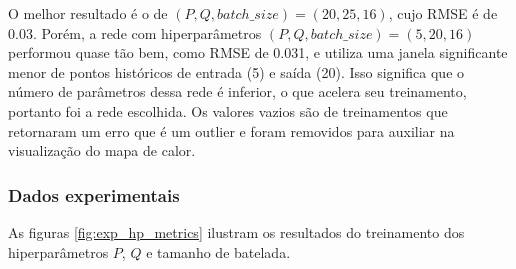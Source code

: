 O melhor resultado é o de $(P,Q,batch\_size)=(20,25,16)$, cujo RMSE é de 0.03.  Porém, a rede com hiperparâmetros $(P,Q,batch\_size)=(5,20,16)$ performou quase tão bem, como RMSE de 0.031, e utiliza uma janela significante menor de pontos históricos de entrada (5) e saída (20). Isso significa que o número de parâmetros dessa rede é inferior, o que acelera seu treinamento, portanto foi a rede escolhida. Os valores vazios são de treinamentos que retornaram um erro que é um outlier e foram removidos para auxiliar na visualização do mapa de calor.

\subsubsection{Dados experimentais}
As figuras \ref{fig:exp_hp_metrics} ilustram os resultados do treinamento dos hiperparâmetros $P$, $Q$ e tamanho de batelada.


